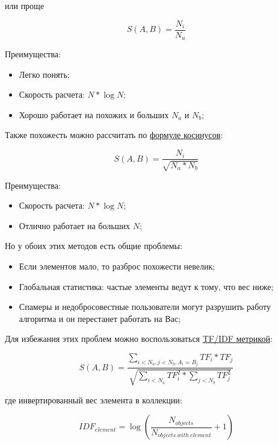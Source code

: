 или проще

\begin{equation}
 \label{eq:smlar2}
 S(A,B) = \frac{N_{i}}{N_{u}}
\end{equation}

Преимущества:

\begin{itemize}
  \item Легко понять;
  \item Скорость расчета: $N * \log{N}$;
  \item Хорошо работает на похожих и больших $N_a$ и $N_b$;
\end{itemize}

Также похожесть можно рассчитать по \href{http://en.wikipedia.org/wiki/Law\_of\_cosines}{формуле косинусов}:

\begin{equation}
 \label{eq:smlar3}
 S(A,B) = \frac{N_{i}}{\sqrt{N_{a}*N_{b}}}
\end{equation}

Преимущества:

\begin{itemize}
  \item Скорость расчета: $N * \log{N}$;
  \item Отлично работает на больших $N$;
\end{itemize}

Но у обоих этих методов есть общие проблемы:

\begin{itemize}
  \item Если элементов мало, то разброс похожести невелик;
  \item Глобальная статистика: частые элементы ведут к тому, что вес ниже;
  \item Спамеры и недобросовестные пользователи могут разрушить работу алгоритма и он перестанет работать на Вас;
\end{itemize}

Для избежания этих проблем можно воспользоваться \href{http://en.wikipedia.org/wiki/Tf*idf}{TF/IDF метрикой}:

\begin{equation}
 \label{eq:smlar4}
 S(A,B) = \frac{\sum_{i < N_{a}, j < N_{b}, A_{i} = B_{j}}TF_{i} * TF_{j}}{\sqrt{\sum_{i < N_{a}}TF_{i}^{2} * \sum_{j < N_{b}}TF_{j}^{2}}}
\end{equation}

где инвертированный вес элемента в коллекции:

\begin{equation}
 \label{eq:smlar5}
 IDF_{element} = \log{(\frac{N_{objects}}{N_{objects\ with\ element}} + 1)}
\end{equation}

